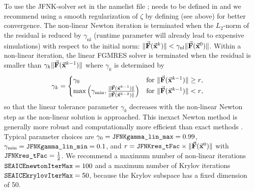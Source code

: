 To use the JFNK-solver set  in the
namelist file ;  needs to
be defined in  and we recommend using a smooth
regularization of $\zeta$ by defining 
(see above) for better convergence.  The non-linear Newton iteration
is terminated when the $L_2$-norm of the residual is reduced by
$\gamma_{\mathrm{nl}}$ (runtime parameter  will already lead to expensive simulations) with respect to
the initial norm: $\|\vec{\mathbf{F}}(\vec{\mathbf{x}}^k)\| <
\gamma_{\mathrm{nl}}\|\vec{\mathbf{F}}(\vec{\mathbf{x}}^0)\|$.  Within a non-linear
iteration, the linear FGMRES solver is terminated when the residual is
smaller than $\gamma_k\|\vec{\mathbf{F}}(\vec{\mathbf{x}}^{k-1})\|$ where $\gamma_k$ is
determined by
\begin{equation}
  \label{eq:jfnkgammalin}
  \gamma_k = 
  \begin{cases} 
    \gamma_0 &\text{for $\|\vek{F}(\vek{x}^{k-1})\| \geq r$},  \\ 
    \max\left(\gamma_{\min},
    \frac{\|\vek{F}(\vek{x}^{k-1})\|}{\|\vek{F}(\vek{x}^{k-2})\|}\right)  
    &\text{for $\|\vek{F}(\vek{x}^{k-1})\| < r$,}
  \end{cases}
\end{equation}
so that the linear tolerance parameter $\gamma_k$ decreases with the
non-linear Newton step as the non-linear solution is approached. This
inexact Newton method is generally more robust and computationally
more efficient than exact methods \citep[e.g.,][]{knoll04:_jfnk}.
Typical parameter choices are
$\gamma_0=\texttt{JFNKgamma\_lin\_max}=0.99$,
$\gamma_{\min}=\texttt{JFNKgamma\_lin\_min}=0.1$, and $r = 
\texttt{JFNKres\_tFac}\times\|\vec{\mathbf{F}}(\vec{\mathbf{x}}^{0})\|$ with
$\texttt{JFNKres\_tFac} = \frac{1}{2}$. We recommend a maximum number of
non-linear iterations $\texttt{SEAICEnewtonIterMax} = 100$ and a maximum
number of Krylov iterations $\texttt{SEAICEkrylovIterMax} = 50$, because
the Krylov subspace has a fixed dimension of 50.

